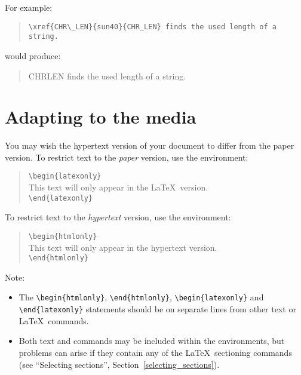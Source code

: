 \documentclass[twoside,11pt]{article}
\newcommand{\htmlref}[2]{#1}
\newcommand{\latex}[1]{#1}
\newcommand{\xref}[3]{#1}
\newcommand{\xlabel}[1]{}
\renewcommand{\_}{\texttt{\symbol{95}}}
\begin{document}
For example:
\begin{quote}
\begin{verbatim}
\xref{CHR\_LEN}{sun40}{CHR_LEN} finds the used length of a string.
\end{verbatim}
\end{quote}
\begin{htmlonly}
would produce:
\begin{quote}
\xref{CHR\_LEN}{sun40}{CHR_LEN} finds the used length of a string.
\end{quote}
\end{htmlonly}


\section{\xlabel{adapting_to_the_media}\label{conditional_text}Adapting to the media}

You may wish the hypertext version of your document to differ from the paper
version.
To restrict text to the \emph{paper}\/ version, use the environment:

\begin{quote}
\verb!\begin!\verb!{latexonly}!\\
This text will only appear in the \LaTeX\ version. \\
\verb!\end!\verb!{latexonly}!
\end{quote}

To restrict text to the \emph{hypertext}\/ version, use the environment:

\begin{quote}
\verb!\begin!\verb!{htmlonly}!\\
This text will only appear in the hypertext version. \\
\verb!\end!\verb!{htmlonly}!
\end{quote}

Note:

\begin{itemize} 
\item The \verb!\begin!\verb!{htmlonly}!, \verb!\end!\verb!{htmlonly}!,
  \verb!\begin!\verb!{latexonly}! and \verb!\end!\verb!{latexonly}!
  statements should be on separate lines from other text or \LaTeX\ commands.
\item Both text and commands may be included within the environments,
  but problems can arise if they contain any of the \LaTeX\ sectioning commands
  (see
  \htmlref{``Selecting sections''}{selecting_sections}\latex{, Section~\ref{selecting_sections}}).
\end{itemize}
\end{document}
